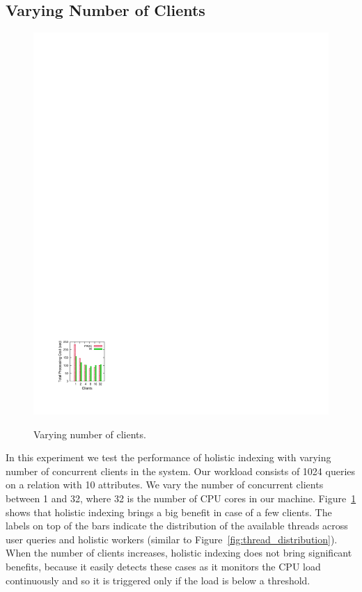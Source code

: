 
\subsection{Varying Number of Clients}
\label{subsec:varcpu}

\begin{figure}
\begin{center}
\includegraphics[trim=2cm 2cm 17cm 23cm]{Figures/holistic/threshold}
\vspace{-0.1in}
\caption{Varying number of clients.}
\vspace{-0.3in}
\label{fig:threshold}
\end{center}
\end{figure}
In this experiment we test the performance of holistic indexing with varying number of concurrent clients in the system.
Our workload consists of 1024 queries on a relation with 10 attributes.
We vary the number of concurrent clients between 1 and 32, where 32 is the number of CPU cores in our machine.
Figure~\ref{fig:threshold} shows that holistic indexing  brings a big benefit in case of a few clients.
The labels on top of the bars indicate the distribution of the available threads across user queries and holistic workers (similar  to Figure~\ref{fig:thread_distribution}).
When the number of clients increases, holistic indexing does not bring significant benefits, because it 
easily detects these cases as it monitors the CPU load continuously and so it is triggered only if the load is below a threshold.
